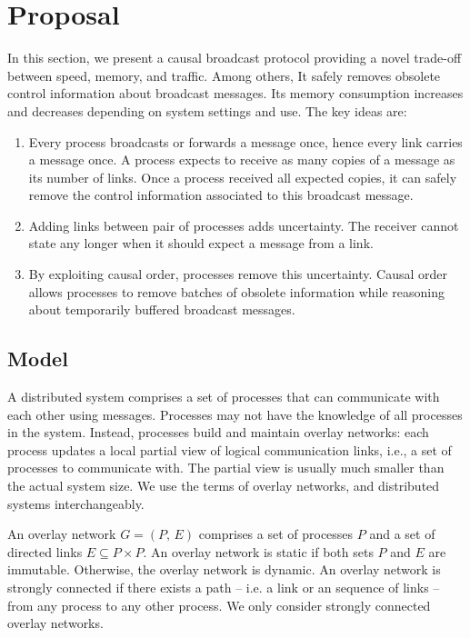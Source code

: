 
\section{Proposal}
\label{sec:proposal}

In this section, we present a causal broadcast protocol providing a novel
trade-off between speed, memory, and traffic. Among others, It safely removes
obsolete control information about broadcast messages. Its memory consumption
increases and decreases depending on system settings and use.  The key ideas
are:
\begin{enumerate}[leftmargin=*]
\item Every process broadcasts or forwards a message once, hence every link
  carries a message once. A process expects to receive as many copies of a
  message as its number of links. Once a process received all expected copies,
  it can safely remove the control information associated to this broadcast
  message.
\item Adding links between pair of processes adds uncertainty. The receiver
  cannot state any longer when it should expect a message from a link.
\item By exploiting causal order, processes remove this uncertainty. Causal
  order allows processes to remove batches of obsolete information while
  reasoning about temporarily buffered broadcast messages.
\end{enumerate}

\subsection{Model}

A distributed system comprises a set of processes that can communicate with each
other using messages. Processes may not have the knowledge of all processes in
the system. Instead, processes build and maintain overlay networks: each process
updates a local partial view of logical communication links, i.e., a set of
processes to communicate with. The partial view is usually much smaller than the
actual system size. We use the terms of overlay networks, and distributed
systems interchangeably.

\begin{definition}
  An overlay network $G = (P,\, E)$ comprises a set of processes $P$ and a set
  of directed links $E \subseteq P \times P$.  An overlay network is static if
  both sets $P$ and $E$ are immutable. Otherwise, the overlay network is
  dynamic. An overlay network is strongly connected if there exists a path --
  i.e. a link or an sequence of links -- from any process to any other
  process. We only consider strongly connected overlay networks.
\end{definition}

